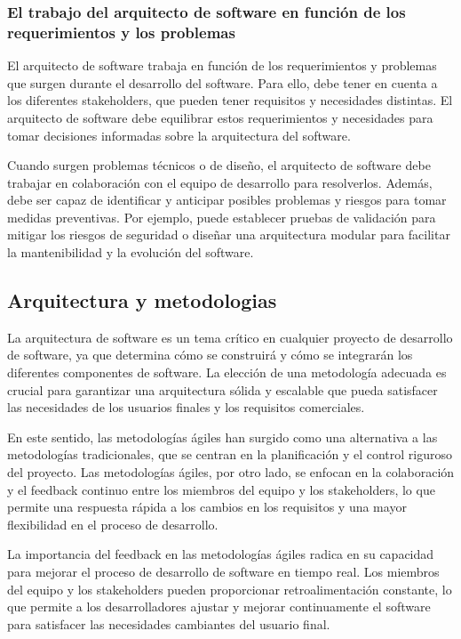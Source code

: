 \documentclass[executivepaper]{article}
\begin{document}
\subsubsection*{El trabajo del arquitecto de software en función de los requerimientos y los problemas}

El arquitecto de software trabaja en función de los requerimientos y problemas que surgen durante el desarrollo del software. Para ello, debe tener en cuenta a los diferentes stakeholders, que pueden tener requisitos y necesidades distintas. El arquitecto de software debe equilibrar estos requerimientos y necesidades para tomar decisiones informadas sobre la arquitectura del software.

Cuando surgen problemas técnicos o de diseño, el arquitecto de software debe trabajar en colaboración con el equipo de desarrollo para resolverlos. Además, debe ser capaz de identificar y anticipar posibles problemas y riesgos para tomar medidas preventivas. Por ejemplo, puede establecer pruebas de validación para mitigar los riesgos de seguridad o diseñar una arquitectura modular para facilitar la mantenibilidad y la evolución del software.

\subsection{Arquitectura y metodologias}
La arquitectura de software es un tema crítico en cualquier proyecto de desarrollo de software, ya que determina cómo se construirá y cómo se integrarán los diferentes componentes de software. La elección de una metodología adecuada es crucial para garantizar una arquitectura sólida y escalable que pueda satisfacer las necesidades de los usuarios finales y los requisitos comerciales.

En este sentido, las metodologías ágiles han surgido como una alternativa a las metodologías tradicionales, que se centran en la planificación y el control riguroso del proyecto. Las metodologías ágiles, por otro lado, se enfocan en la colaboración y el feedback continuo entre los miembros del equipo y los stakeholders, lo que permite una respuesta rápida a los cambios en los requisitos y una mayor flexibilidad en el proceso de desarrollo.

La importancia del feedback en las metodologías ágiles radica en su capacidad para mejorar el proceso de desarrollo de software en tiempo real. Los miembros del equipo y los stakeholders pueden proporcionar retroalimentación constante, lo que permite a los desarrolladores ajustar y mejorar continuamente el software para satisfacer las necesidades cambiantes del usuario final.
\end{document}

